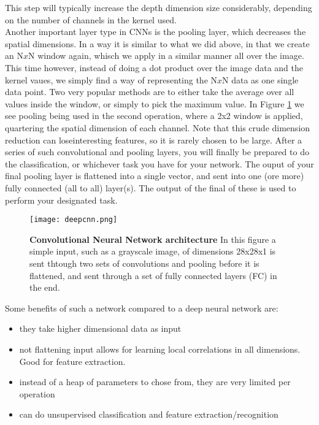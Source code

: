 This step will typically increase the depth dimension size considerably, depending on the number of channels in the kernel used.\\



Another important layer type in CNNs is the pooling layer, which decreases the spatial dimensions. In a way it is similar to what we did above, in that we create an N$x$N window again, whisch we apply in a similar manner all over the image. This time however, instead of doing a dot product over the image data and the kernel vaues, we simply find a way of representing the N$x$N data as one single data point. Two very popular methods are to either take the average over all values inside the window, or simply to pick the maximum value.
In Figure \ref{fig:cnn} we see pooling being used in the second operation, where a 2x2 window is applied, quartering the spatial dimension of each channel. Note that this crude dimension reduction can loseinteresting features, so it is rarely chosen to be large.
After a series of such convolutional and pooling layers, you will finally be prepared to do the classification, or whichever task you have for your network. The ouput of your final pooling layer is flattened into a single vector, and sent into one (ore more) fully connected (all to all) layer(s). The output of the final of these is used to perform your designated task.
\begin{figure}[H]
 \centering
 \texttt{[image: deepcnn.png]}
 \caption{\textbf{Convolutional Neural Network architecture} In this figure a simple input, such as a grayscale image, of dimensions 28x28x1 is sent thtough two sets of convolutions and pooling before it is flattened, and sent through a set of fully connected layers (FC) in  the end.}
 \label{fig:cnn}
\end{figure}
Some benefits of such a network compared to a deep neural network are:
\begin{itemize}
 \item they take higher dimensional data as input
 \item not flattening input allows for learning local correlations in all dimensions. Good for feature extraction.
 \item instead of a heap of parameters to chose from, they are very limited per operation
 \item can do unsupervised classification and feature extraction/recognition
\end{itemize}

